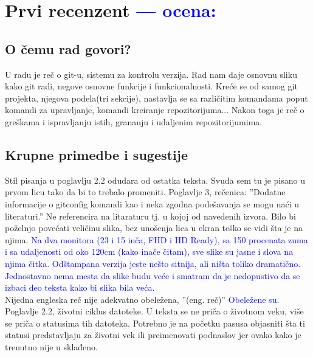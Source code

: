 \documentclass[a4paper]{report}
\newcommand{\odgovor}[1]{\textcolor{blue}{#1}}
\begin{document}
\chapter{Prvi recenzent \odgovor{--- ocena:} }

\section{O čemu rad govori?}
U radu je reč o git-u, sistemu za kontrolu verzija. Rad nam daje osnovnu sliku kako git radi, negove osnovne funkcije i funkcionalnosti. Kreće se od samog git projekta, njegova podela(tri sekcije),  nastavlja se sa različitim komandama poput komandi za upravljanje, komandi kreiranje repozitorijuma... Nakon toga je reč o greškama i ispravljanju istih, grananju i udaljenim repozitorijumima.

\section{Krupne primedbe i sugestije}
Stil pisanja u poglavlju 2.2 odudara od ostatka teksta. Svuda sem tu je pisano u prvom licu tako da bi to trebalo promeniti.\newline
Poglavlje 3, rečenica: ''Dodatne informacije o gitconfig komandi kao i neka zgodna podešavanja se mogu naći u literaturi.'' Ne referencira na litaraturu tj. u kojoj od navedenih izvora.\newline
Bilo bi poželnjo povećati veličinu slika, bez unošenja lica u ekran teško se vidi šta je na njima.\newline
\odgovor{Na dva monitora (23 i 15 inča, FHD i HD Ready), sa 150 procenata zuma i sa udaljenosti od oko 120cm (kako inače čitam), sve slike su jasne i slova na njima čitka. Odštampana verzija jeste nešto sitnija, ali ništa toliko dramatično. Jednostavno nema mesta da slike budu veće i smatram da je nedopustivo da se izbaci deo teksta kako bi slika bila veća.}\\
Nijedna engleska reč nije adekvatno obeležena, ''(eng. reč)'' \newline
\odgovor{Obeležene su.}\\
Poglavlje 2.2, životni ciklus datoteke. U teksta se ne priča o životnom veku, više se priča o statusima tih datoteka. Potrebno je na početku pasusa objasniti šta ti statusi predstavljaju za životni vek ili preimenovati podnaslov jer ovako kako je trenutno nije u sklađeno.
\end{document}
